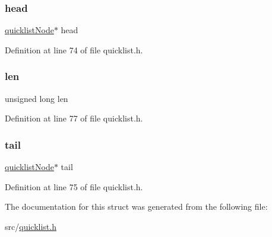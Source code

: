 \subsubsection{\texorpdfstring{head}{head}}
{\footnotesize\ttfamily \hyperlink{structquicklist_node}{quicklist\+Node}$\ast$ head}



Definition at line 74 of file quicklist.\+h.

\mbox{\label{structquicklist_af2e72f8a5bf4bcdb77566c2936d5f13d}} 
\subsubsection{\texorpdfstring{len}{len}}
{\footnotesize\ttfamily unsigned long len}



Definition at line 77 of file quicklist.\+h.

\mbox{\label{structquicklist_a415ce772af9efb537aa65ec5766ed45a}} 
\subsubsection{\texorpdfstring{tail}{tail}}
{\footnotesize\ttfamily \hyperlink{structquicklist_node}{quicklist\+Node}$\ast$ tail}



Definition at line 75 of file quicklist.\+h.



The documentation for this struct was generated from the following file\+:\begin{DoxyCompactItemize}
\item 
src/\hyperlink{quicklist_8h}{quicklist.\+h}\end{DoxyCompactItemize}
